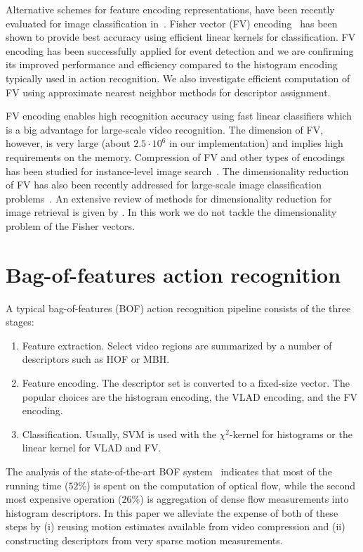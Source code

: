 \documentclass[10pt,twocolumn,letterpaper]{article}
\begin{document}
Alternative schemes for feature encoding
representations,
have been recently evaluated for image classification
in~\cite{Chatfield11}.
Fisher vector (FV) encoding~\cite{Perronnin10} has been shown to
provide best accuracy using efficient linear kernels for
classification. FV encoding has been successfully applied for event detection \cite{Revaud13} and we are confirming its improved performance and efficiency compared to the
histogram encoding typically used in action recognition. We also
investigate efficient computation of FV using approximate
nearest neighbor methods for descriptor assignment.

FV encoding enables high recognition accuracy using fast linear
classifiers which is a big advantage for large-scale video
recognition. The dimension of FV, however, is very large (about
$2.5\cdot10^6$ in our implementation) and implies high
requirements on the memory. Compression of FV and other types of
encodings has been studied for instance-level image
search~\cite{Jegou12}. The dimensionality reduction of FV has
also been recently addressed for large-scale image
classification problems~\cite{Mensink12,Perronnin12,Sanchez13}.
An extensive review of methods for dimensionality reduction for
image retrieval is given by \cite{Grauman13}.
In this work we do not tackle the dimensionality problem of the Fisher vectors.

\section{Bag-of-features action recognition}
A typical bag-of-features (BOF) action recognition pipeline consists of the three stages:
\begin{enumerate}
	\item Feature extraction. Select video regions are summarized by a number of descriptors such as HOF or MBH.
	\item Feature encoding. The descriptor set is converted to a fixed-size vector. The popular choices are the histogram encoding, the VLAD encoding, and the FV encoding.
	\item Classification. Usually, SVM is used with the $\chi^2$-kernel for histograms or the linear kernel for VLAD and FV.
\end{enumerate}

The analysis of the state-of-the-art BOF system~\cite{Wang12} indicates that most of the running time ($52\%$) is spent on the computation of optical flow, while the second most expensive operation ($26\%$) is aggregation of dense flow measurements into histogram descriptors. In this paper we alleviate the expense of both of these steps by (i) reusing motion estimates available from video compression and (ii) constructing descriptors from very sparse motion measurements.
\end{document}
